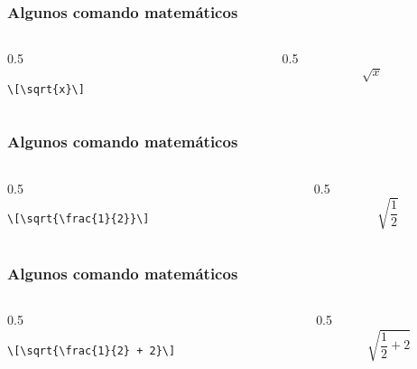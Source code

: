 \documentclass[12pt,aspectratio=169,ignorenonframetext]{ltxbeamer}
\begin{document}
\begin{frame}[fragile]
\frametitle{Algunos comando matemáticos}

\begin{columns}
    \begin{column}{0.5\textwidth}
        \begin{verbatim}
\[\sqrt{x}\]
        \end{verbatim}
    \end{column}
    {\color{gray} \vline}
    \begin{column}{0.5\textwidth}
        \[\sqrt{x}\]
    \end{column}
\end{columns}
\end{frame}





\begin{frame}[fragile]
\frametitle{Algunos comando matemáticos}

\begin{columns}
    \begin{column}{0.5\textwidth}
        \begin{verbatim}
\[\sqrt{\frac{1}{2}}\]
        \end{verbatim}
    \end{column}
    {\color{gray} \vline}
    \begin{column}{0.5\textwidth}
        \[\sqrt{\frac{1}{2}}\]
    \end{column}
\end{columns}
\end{frame}





\begin{frame}[fragile]
\frametitle{Algunos comando matemáticos}

\begin{columns}
    \begin{column}{0.5\textwidth}
        \begin{verbatim}
\[\sqrt{\frac{1}{2} + 2}\]
        \end{verbatim}
    \end{column}
    {\color{gray} \vline}
    \begin{column}{0.5\textwidth}
        \[\sqrt{\frac{1}{2} + 2}\]
    \end{column}
\end{columns}
\end{frame}
\end{document}
